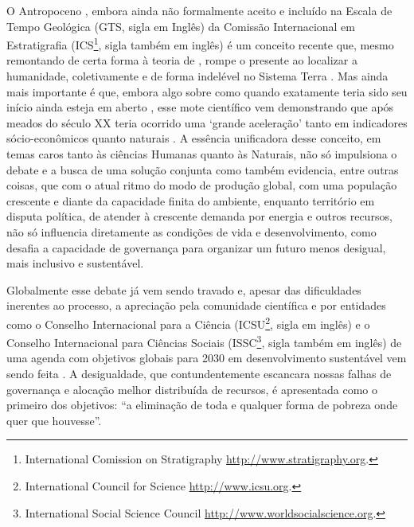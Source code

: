 \documentclass[
	12pt,				%
	openany,			%
	oneside,			%
	a4paper,			%
	english,			%
	french,				%
	spanish,			%
	brazil,				%
	]{abntex2}
\begin{document}
O Antropoceno \cite{crutzen_anthropocene_2000,crutzen_geology_2002}, embora ainda não formalmente aceito e incluído na Escala de Tempo Geológica \cite{gradstein_geologic_2005,cohen_ics_2013} (GTS, sigla em Inglês) da Comissão Internacional em Estratigrafia (ICS\footnote{International Comission on Stratigraphy \url{http://www.stratigraphy.org}.}, sigla também em inglês) é um conceito recente que, mesmo remontando de certa forma à teoria de , rompe o presente \cite{hamilton_anthropocene_2016} ao localizar a humanidade, coletivamente e de forma indelével \cite{zalasiewicz_new_2010,zalasiewicz_anthropocene:_2011} no Sistema Terra \cite{jacobson_earth_2000}. Mas ainda mais importante é que, embora algo sobre como quando exatamente teria sido seu início ainda esteja em aberto \cite{zalasiewicz_when_2015}, esse mote científico vem demonstrando que após meados do século XX teria ocorrido uma `grande aceleração' tanto em indicadores sócio-econômicos quanto naturais  \cite{steffen_anthropocene:_2011}. A essência unificadora desse conceito, em temas caros tanto às ciências Humanas quanto às Naturais, não só impulsiona o debate e a busca de uma solução conjunta como também evidencia, entre outras coisas, que com o atual ritmo do modo de produção global, com uma população crescente e diante da capacidade finita do ambiente, enquanto território em disputa política, de atender à crescente demanda por energia e outros recursos, não só influencia diretamente as condições de vida e desenvolvimento, como desafia a capacidade de governança para organizar um futuro menos desigual, mais inclusivo e sustentável.

Globalmente esse debate já vem sendo travado e, apesar das dificuldades inerentes ao processo, a apreciação pela comunidade científica e por entidades como o Conselho Internacional para a Ciência (ICSU\footnote{International Council for Science \url{http://www.icsu.org}.}, sigla em inglês) e o Conselho Internacional para Ciências Sociais (ISSC\footnote{International Social Science Council \url{http://www.worldsocialscience.org}.}, sigla também em inglês) de uma agenda com objetivos globais para 2030 em desenvolvimento sustentável vem sendo feita \cite{united_nations_transforming_2015,icsu-issc_review_2015}. A desigualdade, que contundentemente escancara nossas falhas de governança e alocação melhor distribuída de recursos, é apresentada como o primeiro dos objetivos: ``a eliminação de toda e qualquer forma de pobreza onde quer que houvesse''\cite{united_nations_transforming_2015}. 
\end{document}
